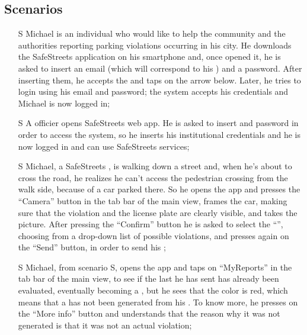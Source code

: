 \documentclass[../../../rasd.tex]{subfiles}
\begin{document}
\subsection{Scenarios\label{sect:3.2.1}}

\begin{itemize}
	\item[S\subs{1}]Michael is an individual who would like to help the community and the authorities reporting parking violations occurring in his city. He downloads the SafeStreets application on his smartphone and, once opened it, he is asked to insert an email (which will correspond to his ) and a password. After inserting them, he accepts the  and taps on the arrow below. Later, he tries to login using his email and password; the system accepts his credentials and Michael is now logged in;
	
	\item[S\subs{2}]A  officier opens SafeStreets web app. He is asked to insert  and password in order to access the system, so he inserts his  institutional credentials and he is now logged in and can use SafeStreets services;
	
	\item[S\subs{3}]Michael, a SafeStreets , is walking down a street and, when he’s about to cross the road, he realizes he can’t access the pedestrian crossing from the walk side, because of a car parked there. So he opens the app and presses the “Camera” button in the tab bar of the main view, frames the car, making sure that the violation and the license plate are clearly visible, and takes the picture. After pressing the “Confirm” button he is asked to select the “”, choosing from a drop-down list of possible violations, and presses again on the “Send” button, in order to send his ;
	
	\item[S\subs{4}]Michael, from scenario S, opens the app and taps on “MyReports” in the tab bar of the main view, to see if the last  he has sent has already been evaluated, eventually becoming a , but he sees that the  color is red, which means that a  has not been generated from his . To know more, he presses on the “More info” button and understands that the reason why it was not generated is that it was not an actual violation;
	

\end{itemize}
\end{document}
